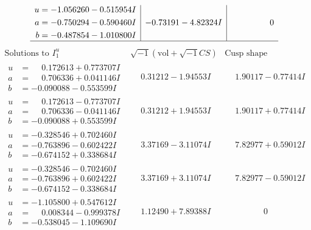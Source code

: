 \documentclass[1p]{elsarticle_modified}
\theoremstyle{definition}
\newcommand{\I}{\sqrt{-1}}
\begin{document}
$$\begin{array}{c|c|c}
\begin{aligned}
u &= -1.056260 - 0.515954 I \\
a &= -0.750294 - 0.590460 I \\
b &= -0.487854 - 1.010800 I\end{aligned}
 & -0.73191 - 4.82324 I & \phantom{-0.000000 } 0\\
 \hline 
 \end{array}$$\newpage$$\begin{array}{c|c|c}  
\text{Solutions to }I^u_{1}& \I (\text{vol} + \sqrt{-1}CS) & \text{Cusp shape}\\
 \hline 
\begin{aligned}
u &= \phantom{-}0.172613 + 0.773707 I \\
a &= \phantom{-}0.706336 + 0.041146 I \\
b &= -0.090088 - 0.553599 I\end{aligned}
 & \phantom{-}0.31212 - 1.94553 I & \phantom{-}1.90117 - 0.77414 I \\ \hline\begin{aligned}
u &= \phantom{-}0.172613 - 0.773707 I \\
a &= \phantom{-}0.706336 - 0.041146 I \\
b &= -0.090088 + 0.553599 I\end{aligned}
 & \phantom{-}0.31212 + 1.94553 I & \phantom{-}1.90117 + 0.77414 I \\ \hline\begin{aligned}
u &= -0.328546 + 0.702460 I \\
a &= -0.763896 - 0.602422 I \\
b &= -0.674152 + 0.338684 I\end{aligned}
 & \phantom{-}3.37169 - 3.11074 I & \phantom{-}7.82977 + 0.59012 I \\ \hline\begin{aligned}
u &= -0.328546 - 0.702460 I \\
a &= -0.763896 + 0.602422 I \\
b &= -0.674152 - 0.338684 I\end{aligned}
 & \phantom{-}3.37169 + 3.11074 I & \phantom{-}7.82977 - 0.59012 I \\ \hline\begin{aligned}
u &= -1.105800 + 0.547612 I \\
a &= \phantom{-}0.008344 - 0.999378 I \\
b &= -0.538045 - 1.109690 I\end{aligned}
 & \phantom{-}1.12490 + 7.89388 I & \phantom{-0.000000 } 0 \\ \hline\begin{aligned}

\end{aligned}
\end{array}$$
\end{document}
